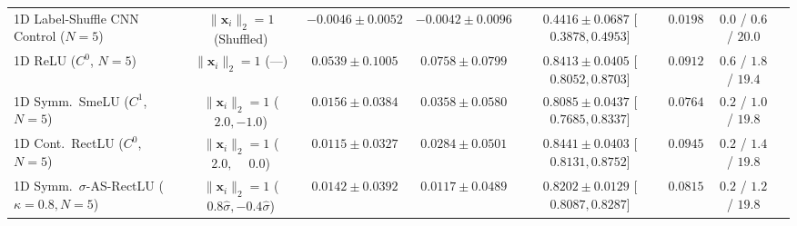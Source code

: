 \documentclass[11pt, a4paper]{article}
\begin{document}
\begin{table}[!htbp]
{\begin{tabular}{l c c c c c c c}
1D Label-Shuffle CNN Control ($N=5$) & $\|\mathbf{x}_{i}\|_{2}=1$ (Shuffled) & $-0.0046 \pm 0.0052$ & $-0.0042 \pm 0.0096$ & $0.4416 \pm 0.0687$ [$0.3878, 0.4953$] & $0.0198$ & $0.0$ / $0.6$ / $20.0$ \\
1D ReLU ($C^{0}$, $N=5$) & $\|\mathbf{x}_{i}\|_{2}=1$ (---) & $0.0539 \pm 0.1005$ & $0.0758 \pm 0.0799$ & $0.8413 \pm 0.0405$ [$0.8052, 0.8703$] & $0.0912$ & $0.6$ / $1.8$ / $19.4$ \\
1D Symm.\ SmeLU ($C^{1}$, $N=5$) & $\|\mathbf{x}_{i}\|_{2}=1$ ($2.0, -1.0$) & $0.0156 \pm 0.0384$ & $0.0358 \pm 0.0580$ & $0.8085 \pm 0.0437$ [$0.7685, 0.8337$] & $0.0764$ & $0.2$ / $1.0$ / $19.8$ \\
1D Cont.\ RectLU ($C^{0}$, $N=5$) & $\|\mathbf{x}_{i}\|_{2}=1$ ($2.0, \phantom{-}0.0$) & $0.0115 \pm 0.0327$ & $0.0284 \pm 0.0501$ & \textbf{$0.8441 \pm 0.0403$} [$0.8131, 0.8752$] & \textbf{$0.0945$} & $0.2$ / $1.4$ / $19.8$ \\
1D Symm.\ $\sigma$-AS-RectLU ($\kappa=0.8, N=5$) & $\|\mathbf{x}_{i}\|_{2}=1$ ($0.8\hat{\sigma}, -0.4\hat{\sigma}$) & $0.0142 \pm 0.0392$ & $0.0117 \pm 0.0489$ & $0.8202 \pm 0.0129$ [$0.8087, 0.8287$] & $0.0815$ & $0.2$ / $1.2$ / $19.8$ \\
\bottomrule
\end{tabular}%
}
\end{table}
\end{document}
